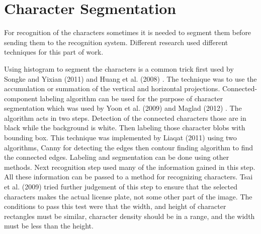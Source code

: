 \section{Character Segmentation}

For recognition of the characters sometimes it is needed to segment them before sending them to the recognition system. Different research used different techniques for this part of work.

Using histogram to segment the characters is a common trick first used by Songke and Yixian (2011) and Huang et al. (2008) \cite{HUANG2008}. The technique was to use the accumulation or summation of the vertical and horizontal projections. Connected-component labeling algorithm can be used for the purpose of character segmentation which was used by Yoon et al. (2009) \cite{yoon_lee_lee_2009} and Maglad (2012) \cite{maglad2012vehicle}. The algorithm acts in two steps. Detection of the connected characters those are in black while the background is white. Then labeling those character blobs with bounding box. This technique was implemented by Liaqat (2011) \cite{liaqat2011mobile} using two algorithms, Canny for detecting the edges then contour finding algorithm to find the connected edges. Labeling and segmentation can be done using other methods. Next recognition step used many of the information gained in this step. All these information can be passed to a method for recognizing characters. Tsai et al. (2009) \cite{tsai2009recognition} tried further judgement of this step to ensure that the selected characters makes the actual license plate, not some other part of the image. The conditions to pass this test were that the width, and height of character rectangles must be similar, character density should be in a range, and the width must be less than the height.